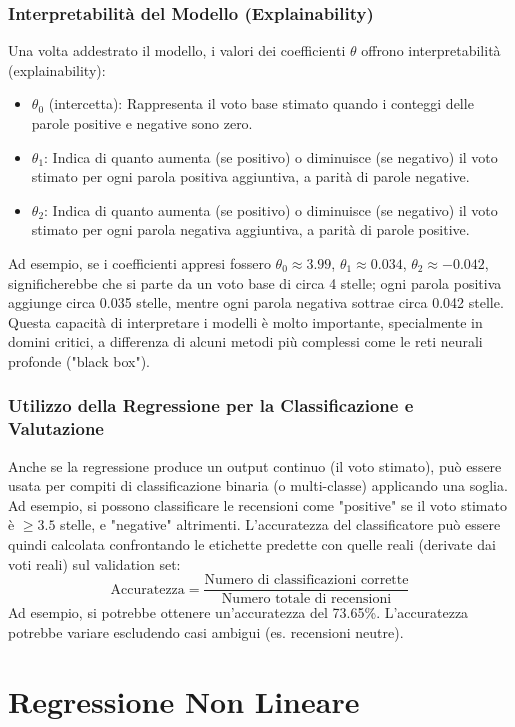 \documentclass{article}
\begin{document}
\subsubsection{Interpretabilità del Modello (Explainability)}
Una volta addestrato il modello, i valori dei coefficienti $\theta$ offrono interpretabilità (explainability):
\begin{itemize}
    \item $\theta_0$ (intercetta): Rappresenta il voto base stimato quando i conteggi delle parole positive e negative sono zero.
    \item $\theta_1$: Indica di quanto aumenta (se positivo) o diminuisce (se negativo) il voto stimato per ogni parola positiva aggiuntiva, a parità di parole negative.
    \item $\theta_2$: Indica di quanto aumenta (se positivo) o diminuisce (se negativo) il voto stimato per ogni parola negativa aggiuntiva, a parità di parole positive.
\end{itemize}
Ad esempio, se i coefficienti appresi fossero $\theta_0 \approx 3.99$, $\theta_1 \approx 0.034$, $\theta_2 \approx -0.042$, significherebbe che si parte da un voto base di circa 4 stelle; ogni parola positiva aggiunge circa 0.035 stelle, mentre ogni parola negativa sottrae circa 0.042 stelle.
Questa capacità di interpretare i modelli è molto importante, specialmente in domini critici, a differenza di alcuni metodi più complessi come le reti neurali profonde ("black box").

\subsubsection{Utilizzo della Regressione per la Classificazione e Valutazione}
Anche se la regressione produce un output continuo (il voto stimato), può essere usata per compiti di classificazione binaria (o multi-classe) applicando una soglia.
Ad esempio, si possono classificare le recensioni come "positive" se il voto stimato è $\ge 3.5$ stelle, e "negative" altrimenti.
L'accuratezza del classificatore può essere quindi calcolata confrontando le etichette predette con quelle reali (derivate dai voti reali) sul validation set:
$$ \text{Accuratezza} = \frac{\text{Numero di classificazioni corrette}}{\text{Numero totale di recensioni}} $$
Ad esempio, si potrebbe ottenere un'accuratezza del 73.65\%. L'accuratezza potrebbe variare escludendo casi ambigui (es. recensioni neutre).



\section{Regressione Non Lineare}
\end{document}
